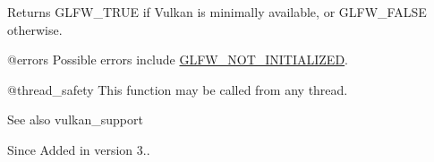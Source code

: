 \begin{DoxyReturn}{Returns}
{\ttfamily G\+L\+F\+W\+\_\+\+T\+R\+UE} if Vulkan is minimally available, or {\ttfamily G\+L\+F\+W\+\_\+\+F\+A\+L\+SE} otherwise.
\end{DoxyReturn}
@errors Possible errors include \mbox{\hyperlink{group__errors_ga2374ee02c177f12e1fa76ff3ed15e14a}{G\+L\+F\+W\+\_\+\+N\+O\+T\+\_\+\+I\+N\+I\+T\+I\+A\+L\+I\+Z\+ED}}.

@thread\+\_\+safety This function may be called from any thread.

\begin{DoxySeeAlso}{See also}
vulkan\+\_\+support
\end{DoxySeeAlso}
\begin{DoxySince}{Since}
Added in version 3.. 
\end{DoxySince}
